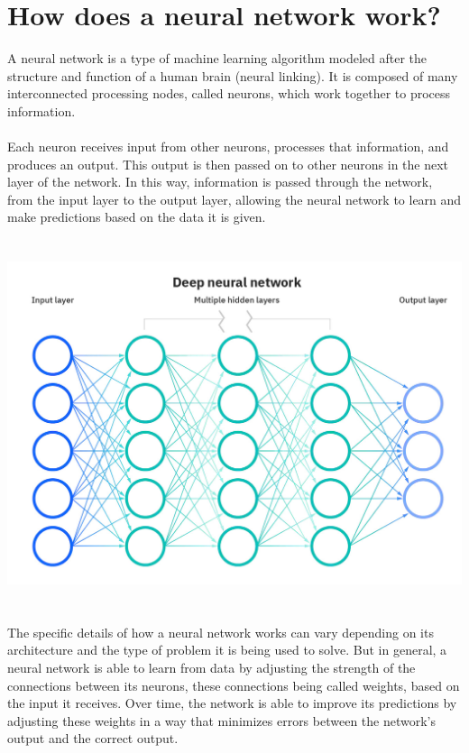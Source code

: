 \section{How does a neural network work?}
A neural network is a type of machine learning algorithm modeled after the structure and function of a human brain (neural linking). It is composed of many interconnected processing nodes, called neurons, which work together to process information. 
\\
\\
Each neuron receives input from other neurons, processes that information, and produces an output. This output is then passed on to other neurons in the next layer of the network. In this way, information is passed through the network, from the input layer to the output layer, allowing the neural network to learn and make predictions based on the data it is given.
\\
\\
\\
\includegraphics[width=1\textwidth]{pics/neuralnetwork.jpg}
\\
\\
\\
The specific details of how a neural network works can vary depending on its architecture and the type of problem it is being used to solve. But in general, a neural network is able to learn from data by adjusting the strength of the connections between its neurons, these connections being called weights, based on the input it receives. Over time, the network is able to improve its predictions by adjusting these weights in a way that minimizes errors between the network's output and the correct output.

